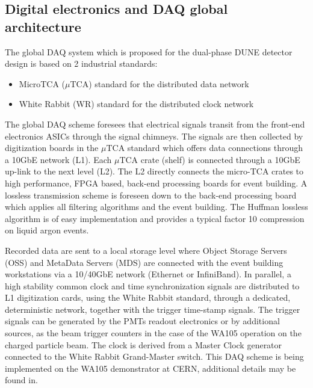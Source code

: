 \subsection{Digital electronics and DAQ global architecture}

The global DAQ system which is proposed for the dual-phase DUNE
detector design is based on 2 industrial standards:
\begin{itemize}
\item MicroTCA ($\mu$TCA) standard for the distributed data network \cite{mTCA-standard}
\item White Rabbit (WR) standard for the distributed clock network \cite{WR-standard}
\end{itemize}

The global DAQ scheme foresees that electrical signals transit from
the front-end electronics ASICs through the signal chimneys. The
signals are then collected by digitization boards in the $\mu$TCA
standard which offers data connections through a 10GbE network
(L1). Each $\mu$TCA crate (shelf) is connected through a 10GbE up-link
to the next level (L2). The L2 directly connects the micro-TCA crates
to high performance, FPGA based, back-end processing boards for event
building. A lossless transmission scheme is foreseen down to the
back-end processing board which applies all filtering algorithms and
the event building. The Huffman lossless algorithm is of easy
implementation and provides a typical factor 10 compression on liquid
argon events.

Recorded data are sent to a local storage level where Object Storage
Servers (OSS) and MetaData Servers (MDS) are connected with the event
building workstations via a 10/40GbE network (Ethernet or
InfiniBand). In parallel, a high stability common clock and time
synchronization signals are distributed to L1 digitization cards,
using the White Rabbit standard, through a dedicated, deterministic
network, together with the trigger time-stamp signals. The trigger
signals can be generated by the PMTs readout electronics or by
additional sources, as the beam trigger counters in the case of the
WA105 operation on the charged particle beam. The clock is derived
from a Master Clock generator connected to the White Rabbit
Grand-Master switch. This DAQ scheme is being implemented on the WA105
demonstrator at CERN, additional details may be found in\cite{WA105_TDR}.

